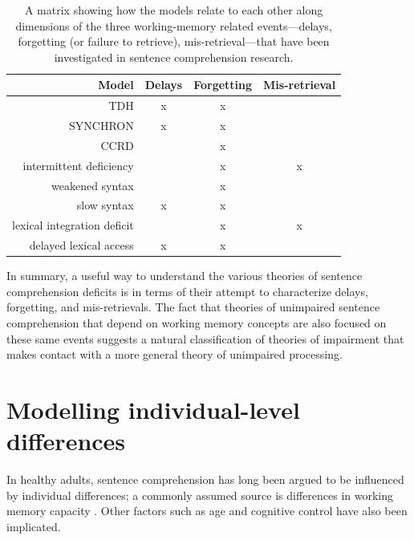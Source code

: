 \documentclass{cambridge7A}\usepackage[]{graphicx}\usepackage[]{color}
\begin{document}
\begin{table}[!htbp]
\centering
\begin{tabular}{rccc}
\hline
Model     &                        Delays  &     Forgetting    &	Mis-retrieval\\  
\hline
TDH                    &          x           &                   x    &	\\
SYNCHRON       &             x        &                  x      &	\\
CCRD                  &                        &                    x   &	\\
 intermittent deficiency   &              &          x             &	x	\\
 weakened syntax        &               &         x              &	\\
 slow syntax                  &   x          &        x   &	\\
 lexical integration deficit  &      &       x              &	x	\\
 delayed lexical access        &  x      &            x   &	\\
\hline
\end{tabular}
\caption{A matrix showing how the models relate to each other along dimensions of the three working-memory related events---delays, forgetting (or failure to retrieve), mis-retrieval---that have been investigated in sentence comprehension research.} \label{modelcomparison}
\end{table}

In summary, a useful way to understand the various theories of sentence comprehension deficits is in terms of their attempt to characterize delays, forgetting, and mis-retrievals. The fact that theories of unimpaired sentence comprehension that depend on working memory concepts
are also focused on these same events suggests a natural classification of theories of impairment that makes contact with a more general theory of unimpaired processing.

\section{Modelling individual-level differences}

In healthy adults, 
sentence comprehension has long been argued to be influenced by individual differences; a commonly assumed source is differences in working memory capacity \citep{DanemanCarpenter1980,JustCarpenter1992}. 
Other factors such as age \citep{CaplanWaters2005} and cognitive control \citep{novick2005cognitive} have also been implicated.
\end{document}
